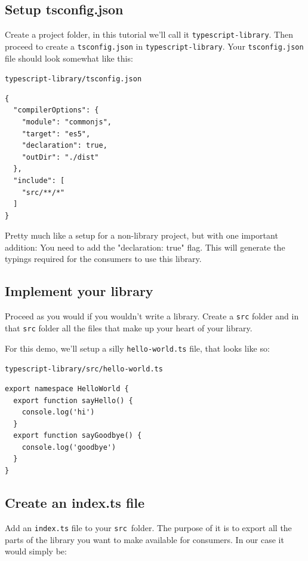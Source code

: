 \documentclass[12pt,a4paper]{article}
\newcommand{\filelabel}[1]{{\footnotesize\color{dkgreen}\texttt{#1}}{\vspace{-0.2cm}}}
\begin{document}
\subsection{\texorpdfstring{ Setup
tsconfig.json}{Setup tsconfig.json}}\label{step-1-setup-tsconfig.json}

Create a project folder, in this tutorial we'll call it
\texttt{typescript-library}. Then proceed to create a
\texttt{tsconfig.json} in \texttt{typescript-library}. Your
\texttt{tsconfig.json} file should look somewhat like this:

\filelabel{typescript-library/tsconfig.json}
\begin{lstlisting}
{
  "compilerOptions": {
    "module": "commonjs",
    "target": "es5",
    "declaration": true,
    "outDir": "./dist"
  },
  "include": [
    "src/**/*"
  ]
}
\end{lstlisting}

Pretty much like a setup for a non-library project, but with one
important addition: You need to add the "{declaration: true}" flag. This
will generate the typings required for the consumers to use this
library.

\subsection{\texorpdfstring{ Implement your
library}{Implement your library}}\label{step-2-implement-your-library}

Proceed as you would if you wouldn't write a library. Create a
\texttt{src} folder and in that \texttt{src} folder all the files that
make up your heart of your library.

For this demo, we'll setup a silly \texttt{hello-world.ts} file, that
looks like so:

\filelabel{typescript-library/src/hello-world.ts}
\begin{lstlisting}
export namespace HelloWorld {
  export function sayHello() {
    console.log('hi')
  }
  export function sayGoodbye() {
    console.log('goodbye')
  }
}
\end{lstlisting}

\subsection{\texorpdfstring{ Create an index.ts
file}{Create an index.ts file}}\label{step-3-create-an-index.ts-file}

Add an \texttt{index.ts} file to your \texttt{src}~folder. The purpose
of it is to export all the parts of the library you want to make
available for consumers. In our case it would simply be:
\end{document}
